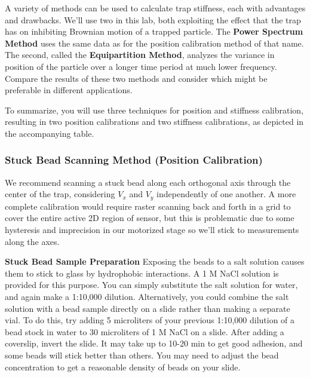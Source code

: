 \documentclass{../lab}
\begin{document}
A variety of methods can be used to calculate trap stiffness, each with advantages and drawbacks. We'll use two in this lab, both exploiting the effect that the trap has on inhibiting Brownian motion of a trapped particle. The \textbf{Power Spectrum Method} uses the same data as for the position calibration method of that name. The second, called the \textbf{Equipartition Method}, analyzes the variance in position of the particle over a longer time period at much lower frequency. Compare the results of these two methods and consider which might be preferable in different applications.

To summarize, you will use three techniques for position and stiffness calibration, resulting in two position calibrations and two stiffness calibrations, as depicted in the accompanying table.

\subsubsection{Stuck Bead Scanning Method (Position Calibration)}

We recommend scanning a stuck bead along each orthogonal axis through the center of the trap, considering $V_x$ and $V_y$ independently of one another. A more complete calibration would require raster scanning back and forth in a grid to cover the entire active 2D region of sensor, but this is problematic due to some hysteresis and imprecision in our motorized stage so we'll stick to measurements along the axes.

\newpage

\textbf{Stuck Bead Sample Preparation} Exposing the beads to a salt solution causes them to stick to glass by hydrophobic interactions. A 1 M NaCl solution is provided for this purpose. You can simply substitute the salt solution for water, and again make a 1:10,000 dilution. Alternatively, you could combine the salt solution with a bead sample directly on a slide rather than making a separate vial. To do this, try adding 5 microliters of your previous 1:10,000 dilution of a bead stock in water to 30 microliters of 1 M NaCl on a slide. After adding a coverslip, invert the slide. It may take up to 10-20 min to get good adhesion, and some beads will stick better than others. You may need to adjust the bead concentration to get a reasonable density of beads on your slide.
\end{document}
